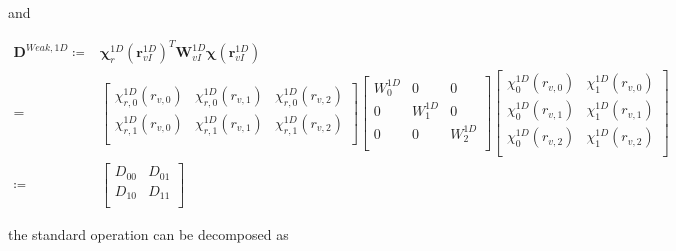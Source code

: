 \documentclass[12pt,Bold,letterpaper,TexShade]{mcgilletdclass}
\numberwithin{equation}{section}
\begin{document}
and

\begin{equation} \nonumber
\begin{split}
\boldsymbol D^{Weak,1D} 
\coloneqq &
\boldsymbol \chi^{1D}_r(\boldsymbol r^{1D}_{vI})^T \boldsymbol W^{1D}_{vI} \boldsymbol \chi(\boldsymbol r^{1D}_{vI}) \\
= &
\begin{bmatrix}
\chi^{1D}_{r,0}(r_{v,0}) & \chi^{1D}_{r,0}(r_{v,1}) & \chi^{1D}_{r,0}(r_{v,2}) \\
\chi^{1D}_{r,1}(r_{v,0}) & \chi^{1D}_{r,1}(r_{v,1}) & \chi^{1D}_{r,1}(r_{v,2}) \\
\end{bmatrix}
\begin{bmatrix}
W^{1D}_0 & 0 & 0 \\
0 & W^{1D}_1 & 0 \\
0 & 0 & W^{1D}_2 \\
\end{bmatrix}
\begin{bmatrix}
\chi^{1D}_0(r_{v,0}) & \chi^{1D}_1(r_{v,0}) \\
\chi^{1D}_0(r_{v,1}) & \chi^{1D}_1(r_{v,1}) \\
\chi^{1D}_0(r_{v,2}) & \chi^{1D}_1(r_{v,2}) \\
\end{bmatrix} \\
\coloneqq &
\begin{bmatrix}
D_{00} & D_{01} \\
D_{10} & D_{11} \\
\end{bmatrix}
\end{split}
\end{equation}

the standard operation can be decomposed as
\end{document}
